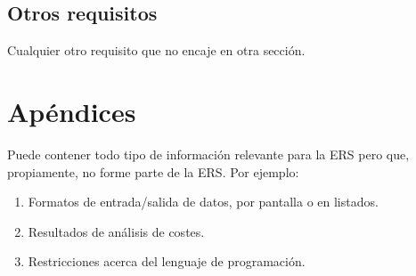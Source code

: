 \documentclass[12pt,a4paper, twosite]{article}
\begin{document}
	
	\subsection{Otros requisitos}
	\label{sec:org31d2978}
	
	Cualquier otro requisito que no encaje en otra sección.
	
	\newpage
	
	
	\section{Apéndices}
	\label{sec:org75cea03}
	
	Puede contener todo tipo de información relevante para la ERS pero
	que, propiamente, no forme parte de la ERS. Por ejemplo:
	
	\begin{enumerate}
		\item Formatos de entrada/salida de datos, por pantalla o en listados.
		
		\item Resultados de análisis de costes.
		
		\item Restricciones acerca del lenguaje de programación.
	\end{enumerate}
\end{document}
